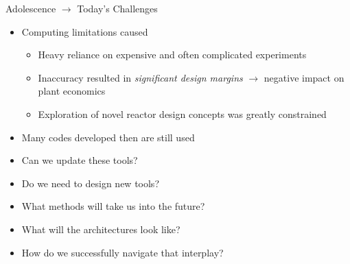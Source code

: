 \documentclass[xcolor=x11names,compress]{beamer}
\renewcommand{\(}{\begin{columns}}
\renewcommand{\)}{\end{columns}}
\newcommand{\<}[1]{\begin{column}{#1}}
\renewcommand{\>}{\end{column}}
\begin{document}
\begin{frame}{Adolescence $\rightarrow$ Today's Challenges}
\begin{itemize}
\item Computing limitations caused
\begin{itemize}
\item Heavy reliance on expensive and often complicated experiments
\item Inaccuracy resulted in \emph{significant design margins} $\rightarrow$ negative impact on plant economics
\item Exploration of novel reactor design concepts was greatly constrained 
\vspace*{1 em}
\end{itemize}
\item Many codes developed then are still used 
\pause
\item Can we update these tools?
\pause
\item Do we need to design new tools?
\pause
\item What methods will take us into the future?
\pause
\item What will the architectures look like?
\pause
\item How do we successfully navigate that interplay?
\end{itemize}
\end{frame}
\end{document}
